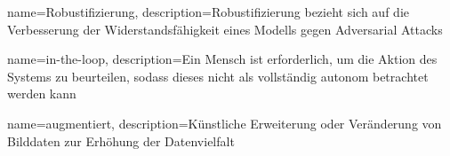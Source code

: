{}

{
        name=Robustifizierung,
        description={Robustifizierung bezieht sich auf die Verbesserung der Widerstandsfähigkeit eines Modells gegen Adversarial Attacks}
}

{
        name=in-the-loop,
        description={Ein Mensch ist erforderlich, um die Aktion des Systems zu beurteilen, sodass dieses nicht als vollständig autonom betrachtet werden kann}
}

{
        name=augmentiert,
        description={Künstliche Erweiterung oder Veränderung von Bilddaten zur Erhöhung der Datenvielfalt}
}

{}








\printglossaries